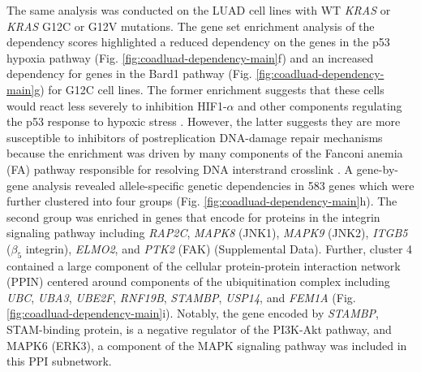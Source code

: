 \documentclass[english, 10pt, letterpaper]{article}
\newcommand{\KRAS}{\emph{KRAS}}
\begin{document}
The same analysis was conducted on the LUAD cell lines with WT \KRAS{} or \KRAS{} G12C or G12V mutations.
The gene set enrichment analysis of the dependency scores highlighted a reduced dependency on the genes in the p53 hypoxia pathway (Fig. \ref{fig:coadluad-dependency-main}f) and an increased dependency for genes in the Bard1 pathway (Fig. \ref{fig:coadluad-dependency-main}g) for G12C cell lines.
The former enrichment suggests that these cells would react less severely to inhibition HIF1-$\alpha$ and other components regulating the p53 response to hypoxic stress \cite{Goda2003Hypoxia-inducibleHypoxia., Sermeus2011ReciprocalPathways., Jing2019RoleMicroenvironment.}.
However, the latter suggests they are more susceptible to inhibitors of postreplication DNA-damage repair mechanisms because the enrichment was driven by many components of the Fanconi anemia (FA) pathway responsible for resolving DNA interstrand crosslink \cite{Ceccaldi2016TheFunctions.}.
A gene-by-gene analysis revealed allele-specific genetic dependencies in 583 genes which were further clustered into four groups (Fig. \ref{fig:coadluad-dependency-main}h).
The second group was enriched in genes that encode for proteins in the integrin signaling pathway including \emph{RAP2C}, \emph{MAPK8} (JNK1), \emph{MAPK9} (JNK2), \emph{ITGB5} ($\beta_5$ integrin), \emph{ELMO2}, and \emph{PTK2} (FAK) (Supplemental Data).
Further, cluster 4 contained a large component of the cellular protein-protein interaction network (PPIN) centered around components of the ubiquitination complex including \emph{UBC}, \emph{UBA3}, \emph{UBE2F}, \emph{RNF19B}, \emph{STAMBP}, \emph{USP14}, and \emph{FEM1A} (Fig. \ref{fig:coadluad-dependency-main}i).
Notably, the gene encoded by \emph{STAMBP}, STAM-binding protein, is a negative regulator of the PI3K-Akt pathway, and MAPK6 (ERK3), a component of the MAPK signaling pathway was included in this PPI subnetwork. 
\end{document}
